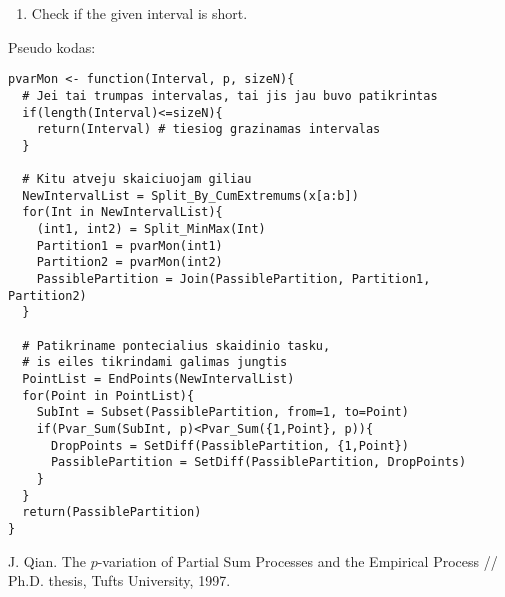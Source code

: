 \documentclass[12pt, a4paper]{article}
\numberwithin{equation}{section}
\begin{document}
\begin{enumerate}
  \item Check if the given interval is short.



\end{enumerate}

Pseudo kodas:
\begin{lstlisting}
pvarMon <- function(Interval, p, sizeN){
  # Jei tai trumpas intervalas, tai jis jau buvo patikrintas 
  if(length(Interval)<=sizeN){
    return(Interval) # tiesiog grazinamas intervalas  
  }

  # Kitu atveju skaiciuojam giliau
  NewIntervalList = Split_By_CumExtremums(x[a:b])
  for(Int in NewIntervalList){
    (int1, int2) = Split_MinMax(Int)
    Partition1 = pvarMon(int1)
    Partition2 = pvarMon(int2)
    PassiblePartition = Join(PassiblePartition, Partition1, Partition2)
  }

  # Patikriname pontecialius skaidinio tasku,
  # is eiles tikrindami galimas jungtis
  PointList = EndPoints(NewIntervalList)
  for(Point in PointList){
    SubInt = Subset(PassiblePartition, from=1, to=Point)
    if(Pvar_Sum(SubInt, p)<Pvar_Sum({1,Point}, p)){
      DropPoints = SetDiff(PassiblePartition, {1,Point})
      PassiblePartition = SetDiff(PassiblePartition, DropPoints)
    }  
  }  
  return(PassiblePartition) 
}
\end{lstlisting}
  
  
\begin{thebibliography}{99}  
   J. Qian. The $p$-variation of Partial Sum Processes
  and the Empirical Process // Ph.D. thesis, Tufts University, 1997.
\end{thebibliography}

 
\end{document}
